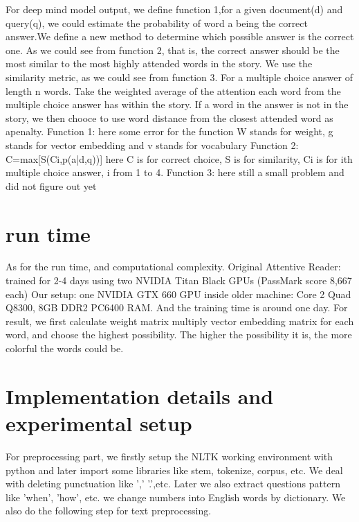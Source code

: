 \documentclass[runningheads,a4paper]{llncs}
\begin{document}
For deep mind model output, we define function 1,for a given document(d) and query(q), we could estimate the probability of word a being the correct answer.We define a new method to determine which possible answer is the correct one. As we could see from function 2, that is, the correct answer should be the most similar to the most highly attended words in the story. We use the similarity metric, as we could see from function 3. For a multiple choice answer of length n words. Take the weighted average of the attention each word from the multiple choice answer has within the story. If a word in the answer is not in the story, we then chooce to use word distance from the closest attended word as apenalty.\newline
Function 1: \newline
 here some error for the function
W stands for weight, g stands for vector embedding and v stands for vocabulary \newline
Function 2: \newline
C=max[S(Ci,p(a|d,q))] \newline
here C is for correct choice, S is for similarity, Ci is for ith multiple choice answer, i from 1 to 4.
\newline
Function 3:\newline
here still a small problem and did not figure out yet
\section{run time}
As for the run time, and computational complexity. Original Attentive Reader: trained for 2-4 days using two NVIDIA Titan Black GPUs (PassMark score 8,667 each)
Our setup: one NVIDIA GTX 660 GPU  inside older machine: Core 2 Quad Q8300, 8GB DDR2 PC6400 RAM. And the training time is around one day.
For result, we first calculate weight matrix multiply vector embedding matrix for each word, and choose the highest possibility. The higher the possibility it is, the more colorful the words could be.



\section{Implementation details and experimental setup}
For preprocessing part, we firstly setup the NLTK working environment with python and later import some libraries like stem, tokenize, corpus, etc. We deal with deleting punctuation like ',' '.',etc. Later we also extract questions pattern like 'when', 'how', etc. we change numbers into English words by dictionary. We also do the following step for text preprocessing. 
\end{document}
